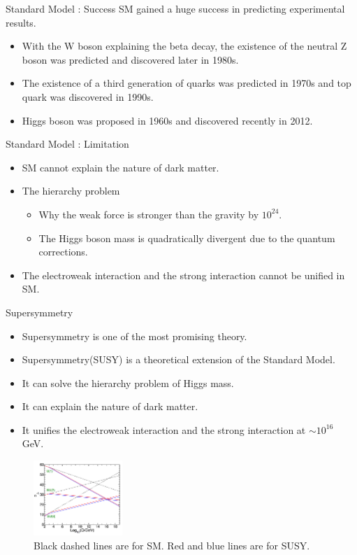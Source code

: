 \documentclass[mathserif,serif]{beamer}
\begin{document}
\begin{frame}{Standard Model : Success}
SM gained a huge success in predicting experimental results.
\begin{itemize}
\item With the W boson explaining the beta decay, the existence of the neutral Z boson was predicted and discovered later in 1980s.
\item The existence of a third generation of quarks was predicted in 1970s and top quark was discovered in 1990s.
\item Higgs boson was proposed in 1960s and discovered recently in 2012.
\end{itemize}
\end{frame}

\begin{frame}{Standard Model : Limitation}
\begin{itemize}
\item SM cannot explain the nature of dark matter.
\item The hierarchy problem
\begin{itemize}
\item Why the weak force is stronger than the gravity by $10^{24}$.
\item The Higgs boson mass is quadratically divergent due to the quantum corrections.
\end{itemize}
\item The electroweak interaction and the strong interaction cannot be unified in SM.
\end{itemize}
\end{frame}

\begin{frame}{Supersymmetry}
\begin{itemize}
\item Supersymmetry is one of the most promising theory.
\item Supersymmetry(SUSY) is a theoretical extension of the Standard Model.
\item It can solve the hierarchy problem of Higgs mass.
\item It can explain the nature of dark matter.
\item It unifies the electroweak interaction and the strong interaction at $\sim 10^{16}$ GeV.
\end{itemize}
\begin{figure}
\centering
\includegraphics[width=0.3\textwidth]{data/photo/theory/unification.png}
\caption{Black dashed lines are for SM. Red and blue lines are for SUSY.}
\end{figure}
\end{frame}
\end{document}
